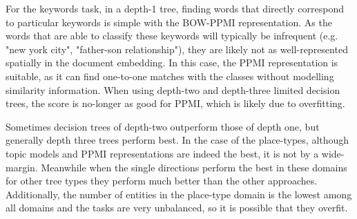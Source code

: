 For the keywords task,  in a depth-1 tree, finding words that  directly correspond to particular keywords is simple with the BOW-PPMI representation. As the words that are able to classify these keywords will typically be infrequent (e.g. "new york city", "father-son relationship"), they are likely not as well-represented spatially in the  document embedding. In this case, the PPMI representation is suitable, as it can find one-to-one matches with the classes without modelling similarity information. When using depth-two and depth-three limited decision trees, the score is no-longer as good for PPMI, which is likely  due to overfitting. 

Sometimes decision trees of depth-two outperform those of depth one, but generally depth three trees perform best.  In the case of the place-types, although topic models and PPMI representations are indeed the best, it is not by a wide-margin. Meanwhile when the single directions perform the best in these domains for other tree types they perform much better than the other approaches. Additionally, the number of entities in the place-type domain is the lowest among all domains and the tasks are very unbalanced, so it is possible that they overfit. 



